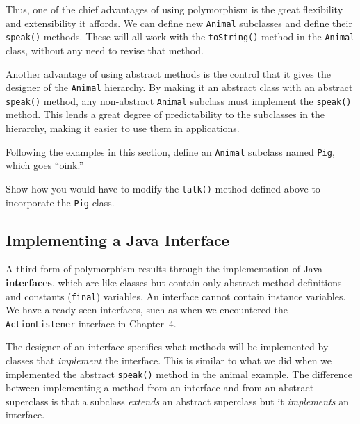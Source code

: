 Thus, one of the chief advantages of using polymorphism is the great
flexibility and extensibility it affords. We can define new {\tt Animal}
subclasses and define their {\tt speak()} methods. These will
all work with the {\tt toString()} method in the {\tt Animal} class,
without any need to revise that method.

Another advantage of using abstract methods is the control that it
gives the designer of the {\tt Animal} hierarchy.  By making it an
abstract class with an abstract {\tt speak()} method, any non-abstract
{\tt Animal} subclass must implement the {\tt speak()} method. This
lends a great degree of predictability to the subclasses in the
hierarchy, making it easier to use them in applications.

\begin{SSTUDY}

\item  Following the examples in this section, define an {\tt Animal} subclass
named {\tt Pig}, which goes ``oink.''

\item  Show how you would have to modify the {\tt talk()} method
defined above to incorporate the {\tt Pig} class. 

\end{SSTUDY}

\subsection{Implementing a Java Interface}

A third form of polymorphism results through the implementation of
Java {\bf interfaces}, which are like classes but contain only
abstract method definitions and constants ({\tt final}) variables.  An
interface cannot contain instance variables.  We have already seen
interfaces, such as when we encountered the {\tt ActionListener}
interface in Chapter~4.

The designer of an interface specifies what methods will be implemented
by classes that {\em implement} the interface. This is similar to what
we did when we implemented the abstract {\tt speak()} method in the
animal example. The difference between implementing a method from an
interface and from an abstract superclass is that a subclass {\em
extends} an abstract superclass but it {\em implements} an interface.

